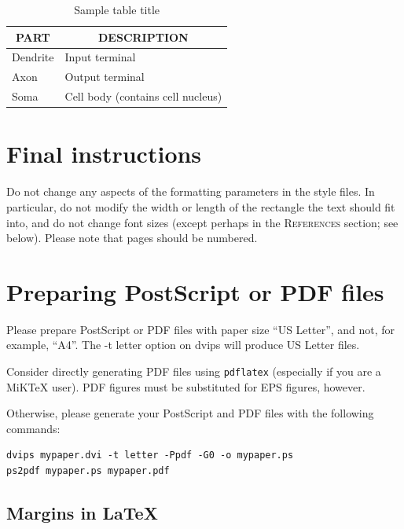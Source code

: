 \documentclass{article} %
\begin{document}
\begin{table}[t]
\begin{center}
\begin{tabular}{ll}
\toprule
\multicolumn{1}{c}{\bf PART}  &\multicolumn{1}{c}{\bf DESCRIPTION} \\
\midrule
Dendrite         &Input terminal \\
Axon             &Output terminal \\
Soma             &Cell body (contains cell nucleus) \\
\bottomrule
\end{tabular}
\end{center}
\caption{Sample table title}\label{sample-table}
\end{table}




\section{Final instructions}
Do not change any aspects of the formatting parameters in the style files.
In particular, do not modify the width or length of the rectangle the text
should fit into, and do not change font sizes (except perhaps in the
\textsc{References} section; see below). Please note that pages should be
numbered.

\section{Preparing PostScript or PDF files}

Please prepare PostScript or PDF files with paper size ``US Letter'', and
not, for example, ``A4''. The -t
letter option on dvips will produce US Letter files.

Consider directly generating PDF files using \verb+pdflatex+
(especially if you are a MiKTeX user).
PDF figures must be substituted for EPS figures, however.

Otherwise, please generate your PostScript and PDF files with the following commands:
\begin{verbatim}
dvips mypaper.dvi -t letter -Ppdf -G0 -o mypaper.ps
ps2pdf mypaper.ps mypaper.pdf
\end{verbatim}

\subsection{Margins in LaTeX}
\end{document}
